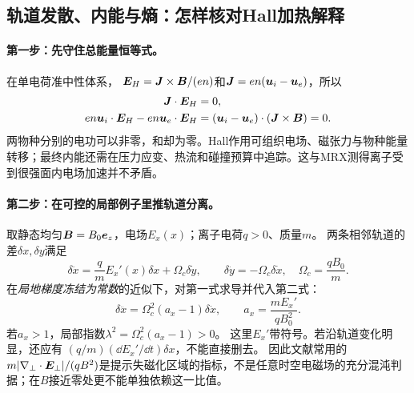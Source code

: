 
\subsection{轨道发散、内能与熵：怎样核对Hall加热解释}\label{sec:synthesis-heating-model}
\paragraph{第一步：先守住总能量恒等式。}
在单电荷准中性体系，
$\bm{E}_H=\bm{J}\times\bm{B}/(en)$和$\bm{J}=en(\bm{u}_i-\bm{u}_e)$，所以
\begin{align}
\bm{J}\cdot\bm{E}_H&=0,\\
en\bm{u}_i\cdot\bm{E}_H-en\bm{u}_e\cdot\bm{E}_H
 &= (\bm{u}_i-\bm{u}_e)\cdot(\bm{J}\times\bm{B})=0.
\end{align}
两物种分别的电功可以非零，和却为零。Hall作用可组织电场、磁张力与物种能量转移；最终内能还需在压力应变、热流和碰撞预算中追踪。这与MRX测得离子受到很强面内电场加速并不矛盾。\citep{Yoo2013,L272}

\paragraph{第二步：在可控的局部例子里推轨道分离。}
取静态均匀$\bm{B}=B_0\bm{e}_z$，电场$E_x(x)$；离子电荷$q>0$、质量$m$。
两条相邻轨道的差$\delta x,\delta y$满足
\begin{equation}
\delta\ddot x=\frac qm E_x'(x)\delta x+\Omega_c\delta\dot y,\qquad
\delta\ddot y=-\Omega_c\delta\dot x,\quad \Omega_c=\frac{qB_0}{m}.
\end{equation}
在\emph{局地梯度冻结为常数}的近似下，对第一式求导并代入第二式：
\begin{equation}
\delta\dddot x=\Omega_c^2(a_x-1)\delta\dot x,\qquad
a_x=\frac{mE_x'}{qB_0^2}.
\end{equation}
若$a_x>1$，局部指数$\lambda^2=\Omega_c^2(a_x-1)>0$。
这里$E_x'$带符号。若沿轨道变化明显，还应有
$(q/m)(\dd E_x'/\dd t)\delta x$，不能直接删去。
因此文献常用的
$m|\nabla_\perp\cdot\bm{E}_\perp|/(qB^2)$是提示失磁化区域的指标，不是任意时空电磁场的充分混沌判据；在$B$接近零处更不能单独依赖这一比值。


